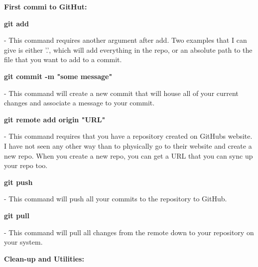 \documentclass[11pt, a4papper]{article}
\begin{document}
\indent \indent \textbf{First commi to GitHut:} \\
\begin{adjustwidth}{3cm}{}

\noindent \textbf{git add}
\begin{adjustwidth}{1cm}{} 
- This command requires another argument after add. Two examples that I can give is either '.', which will add everything in the repo, or an absolute path to the file that you want to add to a commit.
\end{adjustwidth}

\noindent \textbf{git commit -m "some message"}
\begin{adjustwidth}{1cm}{} 
- This command will create a new commit that will house all of your current changes and associate a message to your commit.
\end{adjustwidth}

\noindent \textbf{git remote add origin "URL"}
\begin{adjustwidth}{1cm}{} 
- This command requires that you have a repository created on GitHubs website. I have not seen any other way than to physically go to their website and create a new repo. When you create a new repo, you can get a URL that you can sync up your repo too.
\end{adjustwidth}

\noindent \textbf{git push}
\begin{adjustwidth}{1cm}{} 
- This command will push all your commits to the repository to GitHub.
\end{adjustwidth}

\noindent \textbf{git pull}
\begin{adjustwidth}{1cm}{} 
- This command will pull all changes from the remote down to your repository on your system.
\end{adjustwidth}

\end{adjustwidth}
\pagebreak
\indent \indent \textbf{Clean-up and Utilities:} \\
\end{document}
